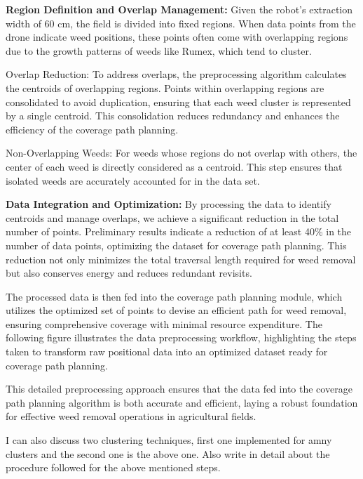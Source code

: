 \vspace*{6mm}  


\textbf{Region Definition and Overlap Management: } Given the robot's extraction width of 60 cm, the field is divided into fixed regions. When data points from the drone indicate weed positions, these points often come with overlapping regions due to the growth patterns of weeds like Rumex, which tend to cluster.

\vspace*{6mm}  


Overlap Reduction: To address overlaps, the preprocessing algorithm calculates the centroids of overlapping regions. Points within overlapping regions are consolidated to avoid duplication, ensuring that each weed cluster is represented by a single centroid. This consolidation reduces redundancy and enhances the efficiency of the coverage path planning.

\vspace*{6mm}  


Non-Overlapping Weeds: For weeds whose regions do not overlap with others, the center of each weed is directly considered as a centroid. This step ensures that isolated weeds are accurately accounted for in the data set.

\vspace*{6mm}  


\textbf{Data Integration and Optimization: }
By processing the data to identify centroids and manage overlaps, we achieve a significant reduction in the total number of points. Preliminary results indicate a reduction of at least 40\% in the number of data points, optimizing the dataset for coverage path planning. This reduction not only minimizes the total traversal length required for weed removal but also conserves energy and reduces redundant revisits.

\vspace*{6mm}  


The processed data is then fed into the coverage path planning module, which utilizes the optimized set of points to devise an efficient path for weed removal, ensuring comprehensive coverage with minimal resource expenditure. The following figure illustrates the data preprocessing workflow, highlighting the steps taken to transform raw positional data into an optimized dataset ready for coverage path planning.

\vspace*{6mm}  



This detailed preprocessing approach ensures that the data fed into the coverage path planning algorithm is both accurate and efficient, laying a robust foundation for effective weed removal operations in agricultural fields.

\vspace*{6mm}  


I can also discuss two clustering techniques, first one implemented for amny clusters and the second one is the above one.  Also write in detail about the procedure followed for the above mentioned steps.
